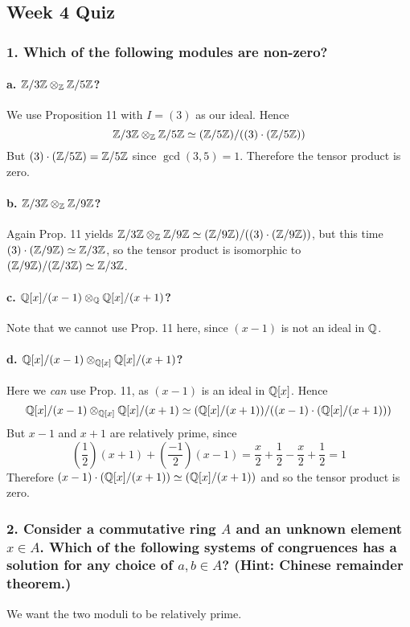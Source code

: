 \subsection[Quiz]{Week 4 Quiz}
\subsubsection*{1. Which of the following modules are non-zero?}
\paragraph*{a. $\mathbb{Z} / 3\mathbb{Z} \otimes_{\mathbb{Z}} \mathbb{Z} / 5\mathbb{Z}$?}
We use Proposition 11 with $I = (3)$ as our ideal. Hence \[\mathbb{Z} / 3\mathbb{Z} \otimes_{\mathbb{Z}} \mathbb{Z} / 5\mathbb{Z} \simeq (\mathbb{Z} / 5\mathbb{Z}) / ((3) \cdot (\mathbb{Z} / 5\mathbb{Z}))\] But $(3) \cdot (\mathbb{Z} / 5\mathbb{Z}) = \mathbb{Z} / 5\mathbb{Z}$ since $\gcd(3, 5) = 1$. Therefore the tensor product is zero.

\paragraph*{b. $\mathbb{Z} / 3\mathbb{Z} \otimes_{\mathbb{Z}} \mathbb{Z} / 9\mathbb{Z}$?}
Again Prop. 11 yields $\mathbb{Z} / 3\mathbb{Z} \otimes_{\mathbb{Z}} \mathbb{Z} / 9\mathbb{Z} \simeq (\mathbb{Z} / 9\mathbb{Z}) / ((3) \cdot (\mathbb{Z} / 9\mathbb{Z}))$, but this time $(3) \cdot (\mathbb{Z} / 9\mathbb{Z}) \simeq \mathbb{Z} / 3\mathbb{Z}$, so the tensor product is isomorphic to $(\mathbb{Z} / 9\mathbb{Z}) / (\mathbb{Z} / 3\mathbb{Z}) \simeq \mathbb{Z} / 3\mathbb{Z}$.

\paragraph*{c. $\mathbb{Q}[x] / (x - 1) \otimes_{\mathbb{Q}} \mathbb{Q}[x] / (x + 1)$?}
Note that we cannot use Prop. 11 here, since $(x - 1)$ is not an ideal in $\mathbb{Q}$. 

\paragraph*{d. $\mathbb{Q}[x] / (x - 1) \otimes_{\mathbb{Q}[x]} \mathbb{Q}[x] / (x + 1)$?}
Here we \emph{can} use Prop. 11, as $(x - 1)$ is an ideal in $\mathbb{Q}[x]$. Hence \[\mathbb{Q}[x] / (x - 1) \otimes_{\mathbb{Q}[x]} \mathbb{Q}[x] / (x + 1) \simeq  (\mathbb{Q}[x] / (x + 1)) / ((x - 1) \cdot (\mathbb{Q}[x] / (x + 1)))\] But $x - 1$ and $x + 1$ are relatively prime, since \[\left(\frac{1}{2}\right)(x + 1) + \left(\frac{-1}{2}\right)(x - 1) = \frac{x}{2} + \frac{1}{2} - \frac{x}{2} + \frac{1}{2} = 1\] Therefore $(x - 1) \cdot (\mathbb{Q}[x] / (x + 1)) \simeq (\mathbb{Q}[x] / (x + 1))$ and so the tensor product is zero.

\subsubsection*{2. Consider a commutative ring $A$ and an unknown element $x \in A$. Which of the following systems of congruences has a solution for any choice of $a, b \in A$? (Hint: Chinese remainder theorem.)}
We want the two moduli to be relatively prime.


